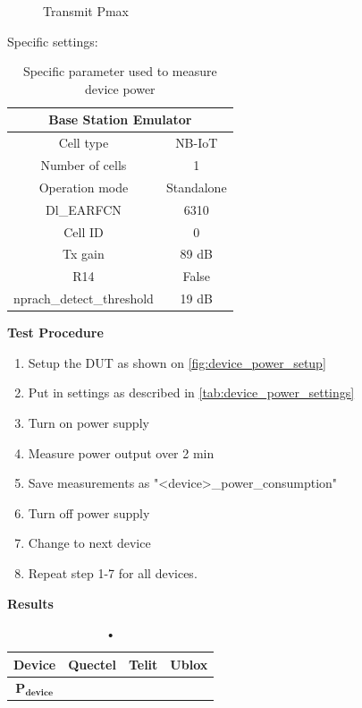\begin{figure}[H]
\centering
\resizebox{\textwidth}{!}{
}
\caption{Transmit Pmax}
\label{fig:device_power_setup}
\end{figure}

Specific settings:
\begin{table}[H]
\centering
\begin{tabular}{|c|c|} \hline
\multicolumn{2}{|c|}{\textbf{Base Station Emulator}} \\ \hline
Cell type          & NB-IoT         \\ \hline
Number of cells    & 1              \\ \hline
Operation mode     & Standalone     \\ \hline
Dl\_EARFCN         & 6310           \\ \hline
Cell ID            & 0              \\ \hline
Tx gain            & 89 dB          \\ \hline
R14                & False          \\ \hline
nprach\_detect\_threshold  & 19 dB  \\ \hline
\end{tabular}
\caption{Specific parameter used to measure device power}
\label{tab:device_power_settings}
\end{table}


\textbf{Test Procedure}\\
\begin{enumerate}
\item Setup the \gls{DUT} as shown on \autoref{fig:device_power_setup}
\item Put in settings as described in \autoref{tab:device_power_settings} 
\item Turn on power supply 
\item Measure power output over 2 min
\item Save measurements as "<device>\_power\_consumption"
\item Turn off power supply
\item Change to next device
\item Repeat step 1-7 for all devices.
\end{enumerate}

\textbf{Results}\\
\begin{table}[H]
\centering
\begin{tabular}{|c|c|c|c|}\hline
\textbf{Device}	& Quectel	& Telit & Ublox \\ \hline
$\mathbf{P_{device}}$	& & & \\ \hline
\end{tabular}
\caption{•}
\label{tab:device_power_results}
\end{table}

